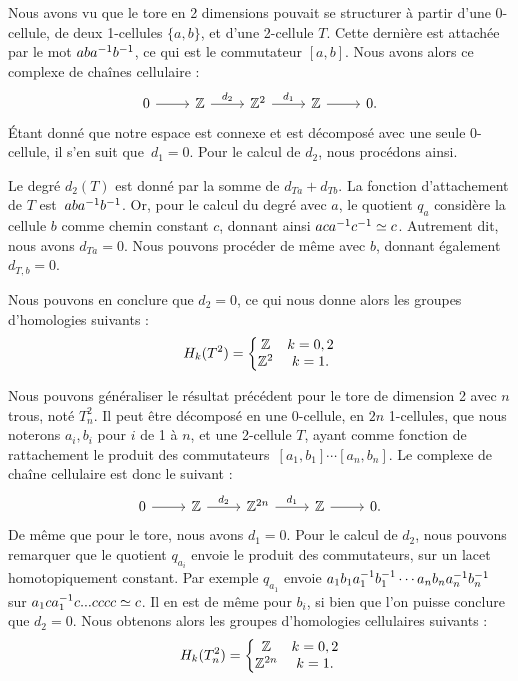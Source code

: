 \begin{exemple}
Nous avons vu que le tore en 2 dimensions pouvait se structurer à partir d'une 0-cellule, de deux 1-cellules $\{a,b\}$, et d'une 2-cellule $T$. Cette dernière est attachée par le mot $aba^{-1} b^{-1}$, ce qui est le commutateur $[a,b]$. Nous avons alors ce complexe de chaînes cellulaire : \[\begin{tikzcd}
0\arrow[r]&\bb{Z}\arrow[r,"d_2"]&\bb{Z}^2\arrow[r,"d_1"]&\bb{Z}\arrow[r]&0.
\end{tikzcd}\] Étant donné que notre espace est connexe et est décomposé avec une seule 0-cellule, il s'en suit que~$d_1=0$. Pour le calcul de $d_2$, nous procédons ainsi.

Le degré $d_2(T)$ est donné par la somme de $d_{Ta}+d_{Tb}$. La fonction d'attachement de $T$ est~${aba^{-1} b^{-1}}$. Or, pour le calcul du degré avec $a$, le quotient $q_a$ considère la cellule $b$ comme chemin constant $c$, donnant ainsi $aca^{-1} c^{-1}\simeq c$. Autrement dit, nous avons $d_{Ta}=0$. Nous pouvons procéder de même avec $b$, donnant également $d_{T,b}=0$.

Nous pouvons en conclure que $d_2=0$, ce qui nous donne alors les groupes d'homologies suivants : \[H_k(T^2)= \left\{\begin{matrix}
\mathbb{Z} &k=0,2  \\
\mathbb{Z}^2 &k=1.  \\
\end{matrix}\right.\]
\end{exemple}
\begin{exemple}
Nous pouvons généraliser le résultat précédent pour le tore de dimension 2 avec $n$ trous, noté $T^2_n$. Il peut être décomposé en une 0-cellule, en $2n$ 1-cellules, que nous noterons $a_i,b_i$ pour $i$ de 1 à $n$, et une 2-cellule $T$, ayant comme fonction de rattachement le produit des commutateurs~${[a_1,b_1]\cdots[a_n,b_n]}$. Le complexe de chaîne cellulaire est donc le suivant : \[\begin{tikzcd}
0\arrow[r]&\bb{Z}\arrow[r,"d_2"]&\bb{Z}^{2n}\arrow[r,"d_1"]&\bb{Z}\arrow[r]&0.
\end{tikzcd}\]
De même que pour le tore, nous avons $d_1=0$. Pour le calcul de $d_2$, nous pouvons remarquer que le quotient $q_{a_i}$ envoie le produit des commutateurs, sur un lacet homotopiquement constant. Par exemple $q_{a_1}$ envoie $a_1b_1a_1^{-1} b_1^{-1}\cdots a_nb_na_n^{-1} b_n^{-1}$ sur $a_1ca_1^{-1} c...cccc\simeq c$. Il en est de même pour $b_i$, si bien que l'on puisse conclure que $d_2=0$. Nous obtenons alors les groupes d'homologies cellulaires suivants : 
\[H_k(T^2_{n})= \left\{\begin{matrix}
\mathbb{Z} &k=0,2  \\
\mathbb{Z}^{2n} &k=1.  \\
\end{matrix}\right.\]
\end{exemple}

